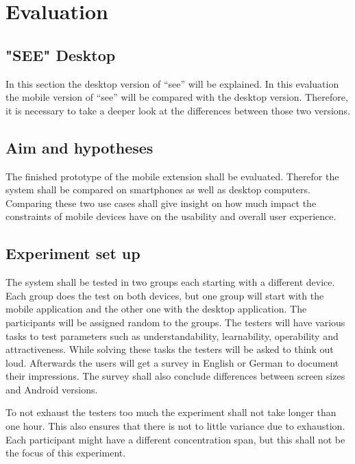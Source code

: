 \section{Evaluation}

\subsection{"SEE" Desktop}
In this section the desktop version of \enquote{\gls{see}} will be explained. 
In this evaluation the mobile version of \enquote{\gls{see}} will be compared with the desktop version.
Therefore, it is necessary to take a deeper look at the differences between those two versions.

\subsection{Aim and hypotheses}
The finished prototype of the mobile extension shall be evaluated. 
Therefor the system shall be compared on smartphones as well as desktop computers. 
Comparing these two use cases shall give insight on how much impact the constraints of mobile devices have on the usability and overall user experience.
\subsection{Experiment set up}
The system shall be tested in two groups each starting with a different device. 
Each group does the test on both devices, but one group will start with the mobile application and the other one with the desktop application.
The participants will be assigned random to the groups.
The testers will have various tasks to test parameters such as understandability, learnability, operability and attractiveness. 
While solving these tasks the testers will be asked to think out loud. 
Afterwards the users will get a survey in English or German to document their impressions.
The survey shall also conclude differences between screen sizes and Android versions. 

To not exhaust the testers too much the experiment shall not take longer than one hour. 
This also ensures that there is not to little variance due to exhaustion.
Each participant might have a different concentration span, but this shall not be the focus of this experiment. 